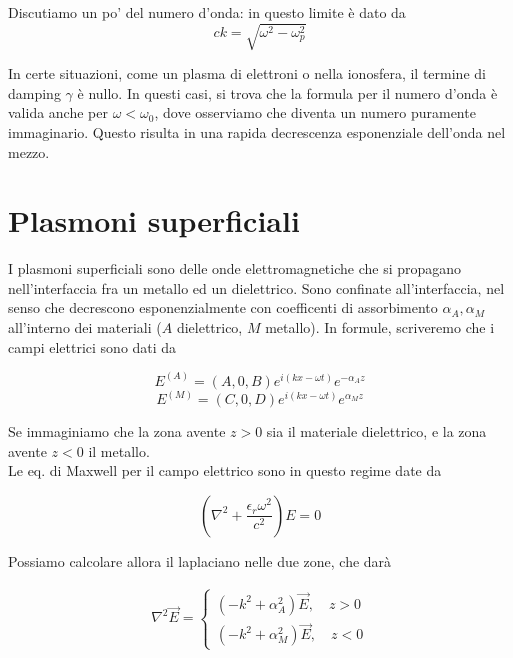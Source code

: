 \documentclass{report}
\begin{document}
Discutiamo un po' del numero d'onda: in questo limite è dato da 
\begin{equation}
    ck = \sqrt{\omega^2 - \omega_p^2}
\end{equation}

In certe situazioni, come un plasma di elettroni o nella ionosfera, il termine di damping $\gamma$ è nullo. In questi casi, si trova che la formula per il numero d'onda è valida anche per $\omega < \omega_0$, dove osserviamo che diventa un numero puramente immaginario. Questo risulta in una rapida decrescenza esponenziale dell'onda nel mezzo. 

\section{Plasmoni superficiali}

I plasmoni superficiali sono delle onde elettromagnetiche che si propagano nell'interfaccia fra un metallo ed un dielettrico. Sono confinate all'interfaccia, nel senso che decrescono esponenzialmente con coefficenti di assorbimento $\alpha_A, \alpha_M$ all'interno dei materiali ($A$ dielettrico, $M$ metallo). In formule, scriveremo che i campi elettrici sono dati da 

\begin{equation}
    E^{(A)} = (A, 0, B)e^{i(kx - \omega t)}e^{-\alpha_Az}
\end{equation}
\begin{equation}
    E^{(M)} = (C, 0, D)e^{i(kx - \omega t)}e^{\alpha_Mz}
\end{equation}

Se immaginiamo che la zona avente $z>0$ sia il materiale dielettrico, e la zona avente $z<0$ il metallo. \\

Le eq. di Maxwell per il campo elettrico sono in questo regime date da 

\begin{equation}
    \left(\nabla^2 + \frac{\epsilon_r\omega^2}{c^2} \right)E = 0 
\end{equation}

Possiamo calcolare allora il laplaciano nelle due zone, che darà 

\begin{align}
    \nabla^2 \vec{E} = \begin{cases}
        (-k^2 +\alpha_A^2)\vec{E}, \quad z > 0 \\ 
        (-k^2 +\alpha_M^2)\vec{E}, \quad z<0 
    \end{cases}
\end{align}
\end{document}
